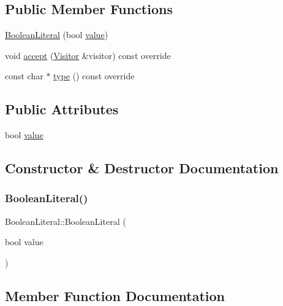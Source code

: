 \subsection*{Public Member Functions}
\begin{DoxyCompactItemize}
\item 
\hyperlink{struct_boolean_literal_ace0fd5afec91d95bb70765a4ea37c10d}{Boolean\+Literal} (bool \hyperlink{struct_boolean_literal_a2d343f4fae4b805fc0260cc86c38d3cc}{value})
\item 
void \hyperlink{struct_boolean_literal_aeb7a30e2b22ac6ad12723da1e72087c5}{accept} (\hyperlink{struct_visitor}{Visitor} \&visitor) const override
\item 
const char $\ast$ \hyperlink{struct_boolean_literal_aa10a3ecbeefe15607c3ac43ed63ba8da}{type} () const override
\end{DoxyCompactItemize}
\subsection*{Public Attributes}
\begin{DoxyCompactItemize}
\item 
bool \hyperlink{struct_boolean_literal_a2d343f4fae4b805fc0260cc86c38d3cc}{value}
\end{DoxyCompactItemize}


\subsection{Constructor \& Destructor Documentation}
\mbox{\label{struct_boolean_literal_ace0fd5afec91d95bb70765a4ea37c10d}} 
\subsubsection{\texorpdfstring{Boolean\+Literal()}{BooleanLiteral()}}
{\footnotesize\ttfamily Boolean\+Literal\+::\+Boolean\+Literal (\begin{DoxyParamCaption}\item[{bool}]{value }\end{DoxyParamCaption})\hspace{0.3cm}{\ttfamily [inline]}}



\subsection{Member Function Documentation}
\mbox{\label{struct_boolean_literal_aeb7a30e2b22ac6ad12723da1e72087c5}} 
